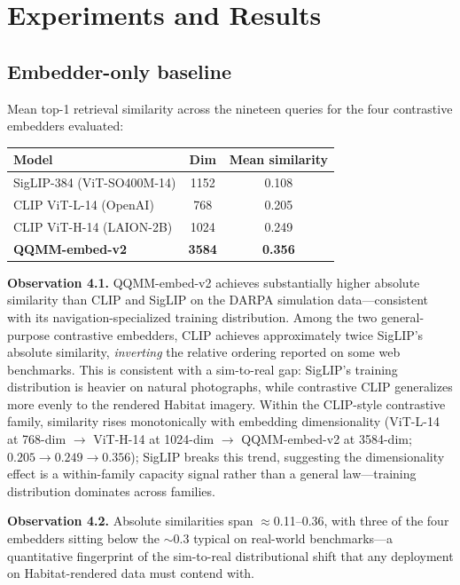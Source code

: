 \documentclass[12pt,letterpaper,oneside]{article}
\begin{document}
\section{Experiments and Results}\label{sec:results}

\subsection{Embedder-only baseline}

Mean top-1 retrieval similarity across the nineteen queries for the
four contrastive embedders evaluated:

\begin{center}
  \small
  \begin{tabular}{@{}lcc@{}}
    \toprule
    Model & Dim & Mean similarity \\
    \midrule
    SigLIP-384 (ViT-SO400M-14) & 1152 & 0.108 \\
    CLIP ViT-L-14 (OpenAI) & 768 & 0.205 \\
    CLIP ViT-H-14 (LAION-2B) & 1024 & 0.249 \\
    \textbf{QQMM-embed-v2} & \textbf{3584} & \textbf{0.356} \\
    \bottomrule
  \end{tabular}
\end{center}

\textbf{Observation 4.1.}  QQMM-embed-v2 achieves substantially higher
absolute similarity than CLIP and SigLIP on the DARPA simulation
data---consistent with its navigation-specialized training
distribution.  Among the two general-purpose contrastive embedders,
CLIP achieves approximately twice SigLIP's absolute similarity,
\emph{inverting} the relative ordering reported on some web
benchmarks.  This is consistent with a sim-to-real gap: SigLIP's
training distribution is heavier on natural photographs, while
contrastive CLIP generalizes more evenly to the rendered Habitat
imagery.  Within the CLIP-style contrastive family, similarity rises
monotonically with embedding dimensionality (ViT-L-14 at 768-dim
$\to$ ViT-H-14 at 1024-dim $\to$ QQMM-embed-v2 at 3584-dim;
$0.205 \to 0.249 \to 0.356$); SigLIP breaks this trend, suggesting
the dimensionality effect is a within-family capacity signal rather
than a general law---training distribution dominates across families.

\textbf{Observation 4.2.}  Absolute similarities span
$\approx$0.11--0.36, with three of the four embedders sitting below
the $\sim$0.3 typical on real-world benchmarks---a quantitative
fingerprint of the sim-to-real distributional shift that any
deployment on Habitat-rendered data must contend with.
\end{document}
